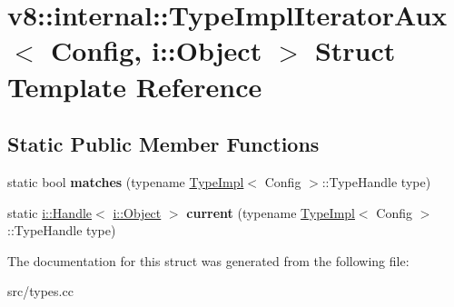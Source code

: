 \hypertarget{structv8_1_1internal_1_1_type_impl_iterator_aux_3_01_config_00_01i_1_1_object_01_4}{}\section{v8\+:\+:internal\+:\+:Type\+Impl\+Iterator\+Aux$<$ Config, i\+:\+:Object $>$ Struct Template Reference}
\label{structv8_1_1internal_1_1_type_impl_iterator_aux_3_01_config_00_01i_1_1_object_01_4}
\subsection*{Static Public Member Functions}
\begin{DoxyCompactItemize}
\item 
\hypertarget{structv8_1_1internal_1_1_type_impl_iterator_aux_3_01_config_00_01i_1_1_object_01_4_a4a0687ed69fe7dad15c2c3ae6242a9c3}{}static bool {\bfseries matches} (typename \hyperlink{classv8_1_1internal_1_1_type_impl}{Type\+Impl}$<$ Config $>$\+::Type\+Handle type)\label{structv8_1_1internal_1_1_type_impl_iterator_aux_3_01_config_00_01i_1_1_object_01_4_a4a0687ed69fe7dad15c2c3ae6242a9c3}

\item 
\hypertarget{structv8_1_1internal_1_1_type_impl_iterator_aux_3_01_config_00_01i_1_1_object_01_4_abe7fa4fbf208c5fb4881ab62e6072b99}{}static \hyperlink{classv8_1_1internal_1_1_handle}{i\+::\+Handle}$<$ \hyperlink{classv8_1_1internal_1_1_object}{i\+::\+Object} $>$ {\bfseries current} (typename \hyperlink{classv8_1_1internal_1_1_type_impl}{Type\+Impl}$<$ Config $>$\+::Type\+Handle type)\label{structv8_1_1internal_1_1_type_impl_iterator_aux_3_01_config_00_01i_1_1_object_01_4_abe7fa4fbf208c5fb4881ab62e6072b99}

\end{DoxyCompactItemize}


The documentation for this struct was generated from the following file\+:\begin{DoxyCompactItemize}
\item 
src/types.\+cc\end{DoxyCompactItemize}
